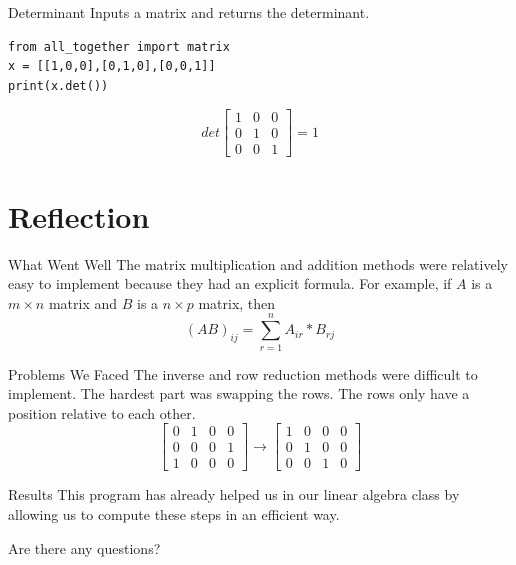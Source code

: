 \documentclass{beamer}
\begin{document}
\begin{frame}[fragile = singleslide]{Determinant}
    Inputs a matrix and returns the determinant. 
\begin{verbatim}
from all_together import matrix    
x = [[1,0,0],[0,1,0],[0,0,1]]
print(x.det()) 
\end{verbatim}
\begin{equation*}
    det \left[
    \begin{array}{ccc}
        1 & 0 &0 \\
        0 &1&0 \\
        0&0&1 
    \end{array}
    \right] = 1
\end{equation*}
\end{frame}


\section{Reflection}
\begin{frame}{What Went Well}
    The matrix multiplication and addition methods were relatively easy to implement because they had an explicit formula. For example, if \(A\) is a \(m \times n\) matrix and \(B\) is a \(n \times p\) matrix, then
    \begin{equation}
        (AB)_{ij} = \sum^{n}_{r=1}A_{ir}*B_{rj}
    \end{equation}
\end{frame}

\begin{frame}{Problems We Faced}
    The inverse and row reduction methods were difficult to implement. The hardest part was swapping the rows. The rows only have a position relative to each other. 
    \begin{equation*}
    \left[
        \begin{array}{cccc}
            0 & 1&0&0  \\
            0 & 0&0&1 \\
            1&0&0&0
        \end{array}
    \right]
    \rightarrow
    \left[
    \begin{array}{cccc}
        1 &0&0&0  \\
         0&1&0&0\\
         0&0&1&0
    \end{array}
    \right]
    \end{equation*}
\end{frame}

\begin{frame}{Results}
    This program has already helped us in our linear algebra class by allowing us to compute these steps in an efficient way. \pause
\begin{center}
    Are there any questions?
\end{center}

\end{frame}
\end{document}
